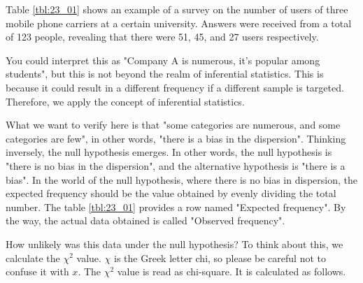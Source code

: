 \documentclass{ltjsbook}
\begin{document}
Table \ref{tbl:23_01} shows an example of a survey on the number of users of three mobile phone carriers at a certain university. Answers were received from a total of 123 people, revealing that there were 51, 45, and 27 users respectively.

You could interpret this as "Company A is numerous, it's popular among students", but this is not beyond the realm of inferential statistics. This is because it could result in a different frequency if a different sample is targeted. Therefore, we apply the concept of inferential statistics.

What we want to verify here is that "some categories are numerous, and some categories are few", in other words, "there is a bias in the dispersion".
Thinking inversely, the null hypothesis emerges. In other words, the null hypothesis is "there is no bias in the dispersion", and the alternative hypothesis is "there is a bias".
In the world of the null hypothesis, where there is no bias in dispersion, the expected frequency should be the value obtained by evenly dividing the total number. The table \ref{tbl:23_01} provides a row named "Expected frequency". By the way, the actual data obtained is called "Observed frequency".

How unlikely was this data under the null hypothesis? To think about this, we calculate the $\chi^2$ value. $\chi$ is the Greek letter chi, so please be careful not to confuse it with $x$. The $\chi^2$ value is read as chi-square. It is calculated as follows.
\end{document}
